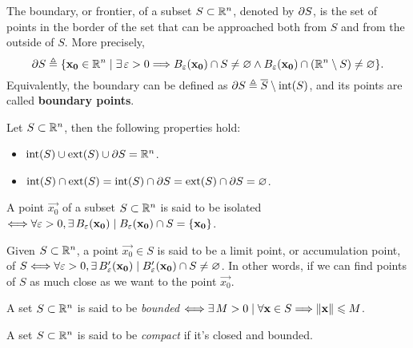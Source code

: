 \begin{defn}[Boundary]
	The boundary, or frontier, of a subset $S\subset\Rtn$, denoted by $\partial S$, is the set of points in the border of the
	set that can be approached both from $S$ and from the outside of $S$. More precisely, 
	\begin{equation}
		\frontier{S}\bydef\{\vec{x_0}\in\Rtn\st\exists\epsilon > 0\implies B_\epsilon
		\argopen(\vec{x_0}\argclose)\cap S\neq\O\land B_\epsilon\argopen(\vec{x_0}\argclose)\cap\left(\Rtn\setminus S\right)
		\neq\O\}.
	\end{equation}
	Equivalently, the boundary can be defined as $\frontier{S}\bydef\closure{S}\setminus\interior{S}$, and its points are called
	\textbf{boundary points}.
\end{defn}

\begin{prop}
	Let $S\subset\Rtn$, then the following properties hold:
	\begin{itemize}[itemsep = -2pt]
		\item $\interior{S}\cup\exterior{S}\cup\frontier{S} = \Rtn$.
		\item $\interior{S}\cap\exterior{S} = \interior{S}\cap\frontier{S} = \exterior{S}\cap\frontier{S} = \O$.
	\end{itemize}
\end{prop}

\begin{defn}
A point $\vec{x_0}$ of a subset $S\subset\Rtn$ is said to be isolated $\iff\forall\epsilon > 0, \exists B_\epsilon\argopen(\vec{x_0}
	\argclose)\st B_\epsilon\argopen(\vec{x_0}\argclose)\cap S = \{\vec{x_0}\}$.
\end{defn}

\begin{defn}
Given $S\subset\Rtn$, a point $\vec{x_0}\in S$ is said to be a limit point, or accumulation point, of $S\iff\forall\epsilon > 0, 
	\exists B'_\epsilon\argopen(\vec{x_0}\argclose)\st B'_\epsilon\argopen(\vec{x_0}\argclose)\cap S\neq\O$. In other words, 
	if we can find points of $S$ as much close as we want to the point $\vec{x_0}$.
\end{defn}

\begin{defn}
A set $S\subset\Rtn$ is said to be \textit{bounded} $\iff\exists M > 0\st\forall\vec{x}\in S\implies \vnorm{\vec{x}}\leq M$.
\end{defn}

\begin{defn}
A set $S\subset\Rtn$ is said to be \textit{compact} if it's closed and bounded.
\end{defn}


